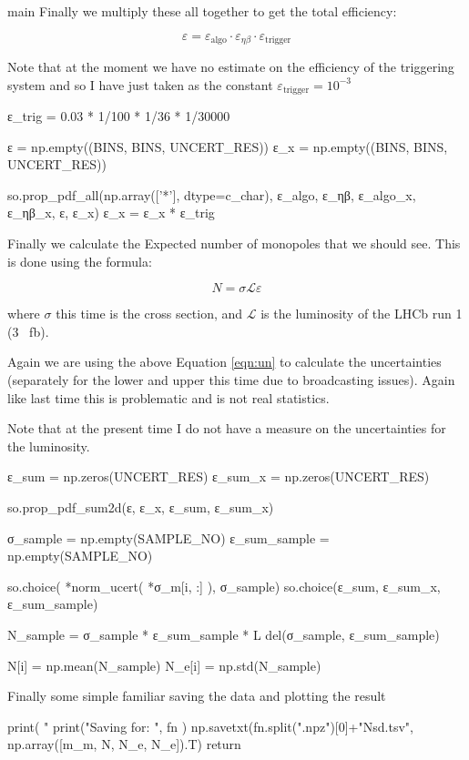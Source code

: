 \documentclass[10pt, a4paper]{article}
\begin{document}
\begin{codeblock}{main}
Finally we multiply these all together to get the total efficiency:

\begin{equation}
 \varepsilon = \varepsilon_\text{algo} \cdot \varepsilon_{\eta\beta} \cdot \varepsilon_\text{trigger}
\end{equation}

Note that at the moment we have no estimate on the efficiency of the triggering system and so I have just taken as the constant $\varepsilon_\text{trigger} = 10^{-3}$

\begin{code}
		ε_trig = 0.03 * 1/100 * 1/36 * 1/30000
		
		ε   = np.empty((BINS, BINS, UNCERT_RES))
		ε_x = np.empty((BINS, BINS, UNCERT_RES))
		
		so.prop_pdf_all(np.array(['*'], dtype=c_char), 
		                ε_algo, ε_ηβ,
		                ε_algo_x, ε_ηβ_x,
		                ε, ε_x)
		ε_x = ε_x * ε_trig
\end{code}

Finally we calculate the Expected number of monopoles that we should see. This is done using the formula:

\begin{equation}
 N = \sigma \mathcal{L} \varepsilon
\end{equation}

where $\sigma$ this time is the cross section, and $\mathcal{L}$ is the luminosity of the LHCb run 1 ($3$ \si{\per\femto\barn}). 

Again we are using the above Equation \eqref{eqn:un} to calculate the uncertainties (separately for the lower and upper this time due to broadcasting issues). Again like last time this is problematic and is not real statistics. 

Note that at the present time I do not have a measure on the uncertainties for the luminosity. 

\begin{code}
		ε_sum = np.zeros(UNCERT_RES)
		ε_sum_x = np.zeros(UNCERT_RES)
		
		so.prop_pdf_sum2d(ε, ε_x, ε_sum, ε_sum_x)
		
		σ_sample = np.empty(SAMPLE_NO)
		ε_sum_sample = np.empty(SAMPLE_NO)
		
		so.choice( *norm_ucert( *σ_m[i, :] ), σ_sample)
		so.choice(ε_sum, ε_sum_x, ε_sum_sample)
		
		N_sample = σ_sample * ε_sum_sample * L
		del(σ_sample, ε_sum_sample)
		
		N[i] = np.mean(N_sample)
		N_e[i] = np.std(N_sample)
\end{code}

Finally some simple familiar saving the data and plotting the result

\begin{code}
		print( "%
	print("Saving for: ", fn )
	np.savetxt(fn.split(".npz")[0]+"Nsd.tsv", np.array([m_m, N, N_e, N_e]).T)	
	return 
\end{code}
\end{codeblock}
\end{document}
